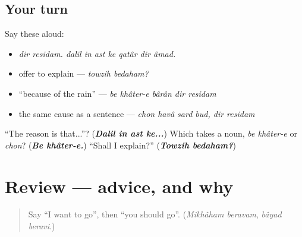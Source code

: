 \subsection*{Your turn}
Say these aloud:

\begin{itemize}
\raggedright
  \item \emph{dir residam. dalil in ast ke qatâr dir âmad.}
  \item offer to explain — \emph{towzih bedaham?}
  \item \textquotedblleft{}because of the rain\textquotedblright{} — \emph{be khâter-e bârân dir residam}
  \item the same cause as a sentence — \emph{chon havâ sard bud, dir residam}
\end{itemize}

\begin{tcolorbox}[breakable,colback=teal!4,colframe=teal!35!black,title={Before you move on}]
\textquotedblleft{}The reason is that...\textquotedblright{}? (\emph{\textbf{Dalil in ast ke...}}) Which takes a noun, \emph{be khâter-e} or \emph{chon}? (\emph{\textbf{Be khâter-e.}}) \textquotedblleft{}Shall I explain?\textquotedblright{} (\emph{\textbf{Towzih bedaham?}})
\end{tcolorbox}
\section[(review)]{Review — advice, and why}

\label{lesson:FA-R293-advice-and-reasons}



\begin{quote}
Say \textquotedblleft{}I want to go\textquotedblright{}, then \textquotedblleft{}you should go\textquotedblright{}. (\emph{Mikhâham beravam}, \emph{bâyad beravi}.)
\end{quote}

